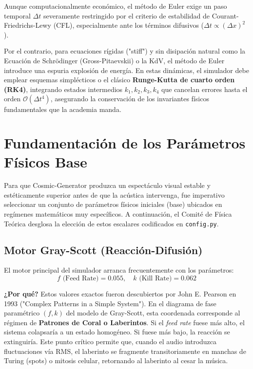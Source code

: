 \documentclass[12pt, openany]{book}
\begin{document}
Aunque computacionalmente económico, el método de Euler exige un paso temporal $\Delta t$ severamente restringido por el criterio de estabilidad de Courant-Friedrichs-Lewy (CFL), especialmente ante los términos difusivos ($\Delta t \propto (\Delta x)^2$). 

Por el contrario, para ecuaciones rígidas ("stiff") y sin disipación natural como la Ecuación de Schrödinger (Gross-Pitaevskii) o la KdV, el método de Euler introduce una espuria explosión de energía. En estas dinámicas, el simulador debe emplear esquemas simplécticos o el clásico \textbf{Runge-Kutta de cuarto orden (RK4)}, integrando estados intermedios $k_1, k_2, k_3, k_4$ que cancelan errores hasta el orden $\mathcal{O}(\Delta t^4)$, asegurando la conservación de los invariantes físicos fundamentales que la academia manda.

\section{Fundamentación de los Parámetros Físicos Base}

Para que Cosmic-Generator produzca un espectáculo visual estable y estéticamente superior antes de que la acústica intervenga, fue imperativo seleccionar un conjunto de parámetros físicos iniciales (base) ubicados en regímenes matemáticos muy específicos. A continuación, el Comité de Física Teórica desglosa la elección de estos escalares codificados en \texttt{config.py}.

\subsection{Motor Gray-Scott (Reacción-Difusión)}
El motor principal del simulador arranca frecuentemente con los parámetros:
\begin{equation}
f \text{ (Feed Rate)} = 0.055, \quad k \text{ (Kill Rate)} = 0.062
\end{equation}

\textbf{¿Por qué?} Estos valores exactos fueron descubiertos por John E. Pearson en 1993 ("Complex Patterns in a Simple System"). En el diagrama de fase paramétrico $(f, k)$ del modelo de Gray-Scott, esta coordenada corresponde al régimen de \textbf{Patrones de Coral o Laberintos}. 
Si el \textit{feed rate} fuese más alto, el sistema colapsaría a un estado homogéneo. Si fuese más bajo, la reacción se extinguiría. Este punto crítico permite que, cuando el audio introduzca fluctuaciones vía RMS, el laberinto se fragmente transitoriamente en manchas de Turing (spots) o mitosis celular, retornando al laberinto al cesar la música.
\end{document}
